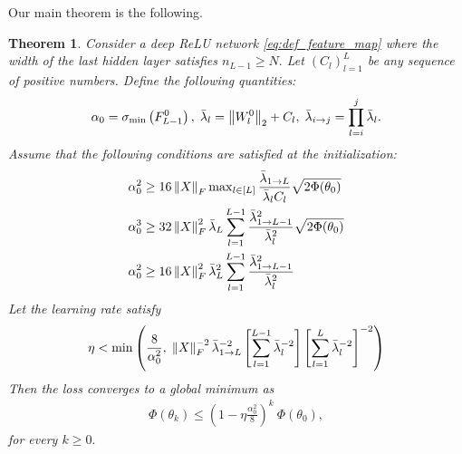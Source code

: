 \documentclass{article}
\newtheorem{theorem}{Theorem}[section]
\newcommand{\norm}[1]{\left\|#1\right\|}
\newcommand{\svmin}[1]{\sigma_{\rm min}\left(#1\right)}
\def\min{\mathop{\rm min}\nolimits}
\def\max{\mathop{\rm max}\nolimits}
\begin{document}
Our main theorem is the following.
\begin{theorem}\label{thm:general}
    Consider a deep ReLU network \eqref{eq:def_feature_map} where the width of the last hidden layer satisfies $n_{L-1}\geq N.$
    Let $(C_l)_{l=1}^{L}$ be any sequence of positive numbers.
    Define the following quantities:
    \begin{equation}\label{eq:notation_init}
	\alpha_0=\svmin{F_{L-1}^0},\;
	\bar{\lambda}_l = \norm{W_l^0}_2 + C_l,\;
	\bar{\lambda}_{i\to j} = \prod_{l=i}^j\bar{\lambda}_l .
    \end{equation}
    Assume that the following conditions are satisfied at the initialization:
    \begin{align}
	&\alpha_0^2 \geq 16\norm{X}_F \max_{l\in[L]} \frac{\bar{\lambda}_{1\to L}}{\bar{\lambda}_l C_l} \sqrt{2\Phi(\theta_0)} \label{eq:initW}\\
	&\alpha_0^3 \geq 32\norm{X}_F^2 \bar{\lambda}_{L} \sum_{l=1}^{L-1} \frac{\bar{\lambda}_{1\to L-1}^2}{\bar{\lambda}_l^{2}} \sqrt{2\Phi(\theta_0)} \label{eq:initF} \\
	&\alpha_0^2 \geq 16\norm{X}_F^2 \bar{\lambda}_L^2 \sum_{l=1}^{L-1} \frac{\bar{\lambda}_{1\to L-1}^2}{\bar{\lambda}_l^{2}} \label{eq:initS} 
    \end{align}
    Let the learning rate satisfy
    \begin{align}\label{eq:eta}
	\eta < \min\left( \frac{8}{\alpha_0^2},\; \norm{X}_F^{-2} \bar{\lambda}_{1\to L}^{-2} \left[\sum_{l=1}^{L-1}\bar{\lambda}_l^{-2}\right] \left[\sum_{l=1}^L\bar{\lambda}_l^{-2}\right]^{-2} \right)
    \end{align}
    Then the loss converges to a global minimum as 
    \begin{align}
	\Phi(\theta_k)\leq \left(1-\eta\frac{\alpha_0^2}{8}\right)^k\ \Phi(\theta_0),
    \end{align}
    for every $k\geq 0.$
\end{theorem}
\end{document}
